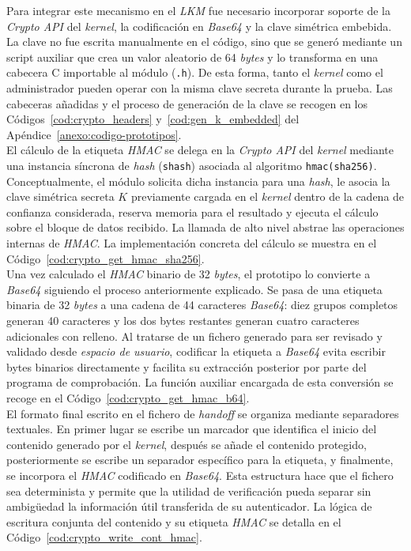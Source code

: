 Para integrar este mecanismo en el \textit{LKM} fue necesario incorporar soporte de la \textit{Crypto API} del \textit{kernel}, la codificación en \textit{Base64} y la clave simétrica embebida.
La clave no fue escrita manualmente en el código, sino que se generó mediante un script auxiliar que crea un valor aleatorio de 64 \textit{bytes} y lo transforma en una cabecera C importable al módulo (\texttt{.h}).
De esta forma, tanto el \textit{kernel} como el administrador pueden operar con la misma clave secreta durante la prueba.
Las cabeceras añadidas y el proceso de generación de la clave se recogen en los Códigos~\ref{cod:crypto_headers} y~\ref{cod:gen_k_embedded} del Apéndice~\ref{anexo:codigo-prototipos}.\\

El cálculo de la etiqueta \textit{HMAC} se delega en la \textit{Crypto API} del \textit{kernel} mediante una instancia síncrona de \textit{hash} (\texttt{shash}) asociada al algoritmo \texttt{hmac(sha256)}.
Conceptualmente, el módulo solicita dicha instancia para una \textit{hash}, le asocia la clave simétrica secreta \(K\) previamente cargada en el \textit{kernel} dentro de la cadena de confianza considerada, reserva memoria para el resultado y ejecuta el cálculo sobre el bloque de datos recibido.
La llamada de alto nivel abstrae las operaciones internas de \textit{HMAC}.
La implementación concreta del cálculo se muestra en el Código~\ref{cod:crypto_get_hmac_sha256}.\\

Una vez calculado el \textit{HMAC} binario de 32 \textit{bytes}, el prototipo lo convierte a \textit{Base64} siguiendo el proceso anteriormente explicado.
Se pasa de una etiqueta binaria de 32 \textit{bytes} a una cadena de 44 caracteres \textit{Base64}: diez grupos completos generan 40 caracteres y los dos bytes restantes generan cuatro caracteres adicionales con relleno.
Al tratarse de un fichero generado para ser revisado y validado desde \textit{espacio de usuario}, codificar la etiqueta a \textit{Base64} evita escribir bytes binarios directamente y facilita su extracción posterior por parte del programa de comprobación.
La función auxiliar encargada de esta conversión se recoge en el Código~\ref{cod:crypto_get_hmac_b64}.\\

El formato final escrito en el fichero de \textit{handoff} se organiza mediante separadores textuales.
En primer lugar se escribe un marcador que identifica el inicio del contenido generado por el \textit{kernel}, después se añade el contenido protegido, posteriormente se escribe un separador específico para la etiqueta, y finalmente, se incorpora el \textit{HMAC} codificado en \textit{Base64}.
Esta estructura hace que el fichero sea determinista y permite que la utilidad de verificación pueda separar sin ambigüedad la información útil transferida de su autenticador.
La lógica de escritura conjunta del contenido y su etiqueta \textit{HMAC} se detalla en el Código~\ref{cod:crypto_write_cont_hmac}.\\

